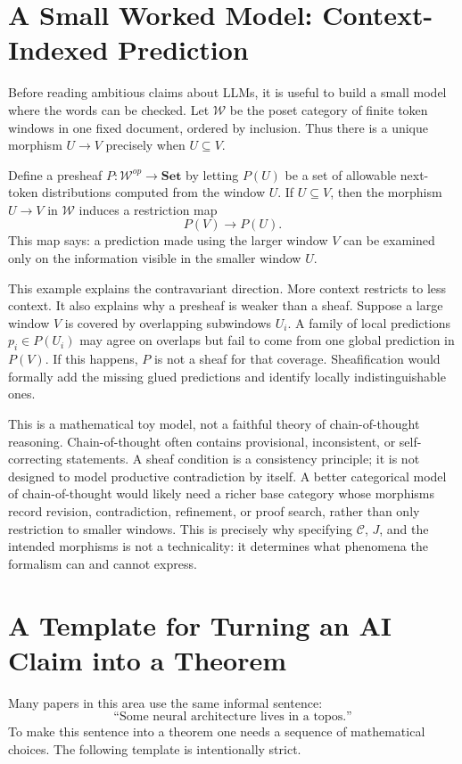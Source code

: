 \documentclass[11pt]{article}
\newcommand{\Set}{\mathbf{Set}}
\begin{document}
\section{A Small Worked Model: Context-Indexed Prediction}

Before reading ambitious claims about LLMs, it is useful to build a small model
where the words can be checked. Let \(\mathcal W\) be the poset category of
finite token windows in one fixed document, ordered by inclusion. Thus there is
a unique morphism \(U\to V\) precisely when \(U\subseteq V\).

Define a presheaf \(P:\mathcal W^{op}\to\Set\) by letting \(P(U)\) be a set of
allowable next-token distributions computed from the window \(U\). If
\(U\subseteq V\), then the morphism \(U\to V\) in \(\mathcal W\) induces a
restriction map
\[
P(V)\longrightarrow P(U).
\]
This map says: a prediction made using the larger window \(V\) can be examined
only on the information visible in the smaller window \(U\).

This example explains the contravariant direction. More context restricts to
less context. It also explains why a presheaf is weaker than a sheaf. Suppose a
large window \(V\) is covered by overlapping subwindows \(U_i\). A family of
local predictions \(p_i\in P(U_i)\) may agree on overlaps but fail to come from
one global prediction in \(P(V)\). If this happens, \(P\) is not a sheaf for
that coverage. Sheafification would formally add the missing glued predictions
and identify locally indistinguishable ones.

This is a mathematical toy model, not a faithful theory of chain-of-thought
reasoning. Chain-of-thought often contains provisional, inconsistent, or
self-correcting statements. A sheaf condition is a consistency principle; it is
not designed to model productive contradiction by itself. A better categorical
model of chain-of-thought would likely need a richer base category whose
morphisms record revision, contradiction, refinement, or proof search, rather
than only restriction to smaller windows. This is precisely why specifying
\(\mathcal C\), \(J\), and the intended morphisms is not a technicality: it
determines what phenomena the formalism can and cannot express.

\section{A Template for Turning an AI Claim into a Theorem}

Many papers in this area use the same informal sentence:
\[
\text{``Some neural architecture lives in a topos.''}
\]
To make this sentence into a theorem one needs a sequence of mathematical
choices. The following template is intentionally strict.
\end{document}
